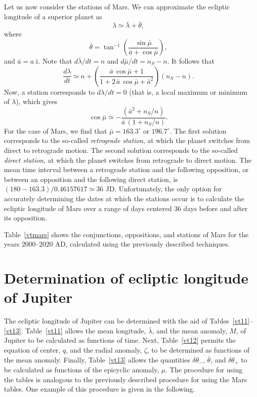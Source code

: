 Let us now consider the stations of Mars. We can approximate the ecliptic longitude of a superior
planet
as
\begin{equation}
\lambda \simeq \bar{\lambda} + \bar{\theta},
\end{equation}
where
\begin{equation}
\bar{\theta} = \tan^{-1}\left(\frac{\sin \bar{\mu}}{\bar{a}+\cos\bar{\mu}}\right),
\end{equation}
and $\bar{a} = a\,\bar{z}$. 
Note that $d\bar{\lambda}/dt= n$ and $d\bar{\mu}/dt = n_S-n$. It follows that
\begin{equation}
\frac{d\lambda}{dt} \simeq n + \left(\frac{\bar{a}\, \cos\bar{\mu}+1}{1+2\,\bar{a}\,\cos\bar{\mu}+\bar{a}^2}\right) (n_S-n).
\end{equation}
Now, a station corresponds to $d\lambda/dt = 0$ (that is, a local maximum or minimum of $\lambda$), which gives
\begin{equation}
\cos\bar{\mu} \simeq - \frac{(\bar{a}^2 + n_S/n)}{\bar{a}\,(1+n_S/n)}.
\end{equation}
For the case of Mars, we find that $\bar{\mu}=163.3^\circ$ or $196.7^\circ$. The first solution corresponds
to the so-called {\em retrograde station}, at which the planet switches from direct to retrograde motion.
The second solution corresponds to the so-called {\em direct station}, at which the planet switches
from retrograde to direct motion. The mean time interval between a retrograde station and the following
opposition, or between an opposition and the following direct station, is $(180-163.3)/0.46157617\simeq 36$ JD. 
Unfortunately, the only option for accurately determining the  dates at which the stations occur is to calculate
the ecliptic longitude of Mars over a range of days centered 36 days  before and after its opposition.

Table~\ref{vtmars} shows the conjunctions, oppositions, and
stations of Mars for the years 2000--2020 AD, calculated using the
previously described techniques.

\section{Determination of ecliptic longitude of Jupiter}
The ecliptic longitude of Jupiter can be determined with the aid of Tables~\ref{vt11}--\ref{vt13}. Table~\ref{vt11} allows
the mean longitude, $\bar{\lambda}$, and the mean anomaly, $M$, of Jupiter to be calculated as functions of
time. Next, Table~\ref{vt12} permits the equation of center, $q$, and the radial anomaly, $\zeta$, to
be determined as functions of the mean anomaly. Finally, Table~\ref{vt13} allows the quantities
$\delta\theta_-$, $\bar{\theta}$, and $\delta\theta_+$ to be calculated as functions of the epicyclic
anomaly, $\mu$. 
The procedure for using the tables is analogous to the previously described procedure for
using the Mars tables.
One example of this procedure is given in the following.

